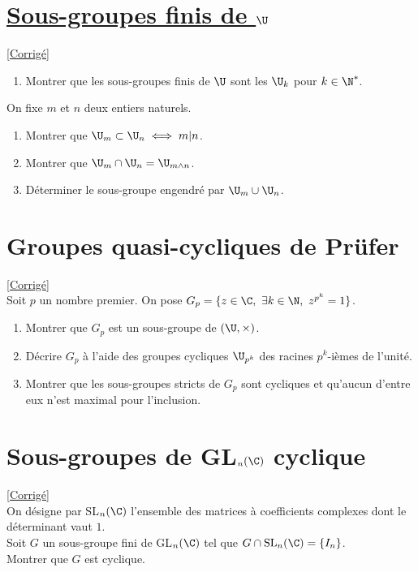 \documentclass[8pt]{book}
\begin{document}
	\section{\underline{Sous-groupes finis de $\U$} }
	\label{Sous-groupes finis de U}
	\textcolor{blue}{\hyperref[Sous-groupes finis de U corrigé]{[Corrigé]}}\\
	\begin{enumerate}[leftmargin=*]
		\item Montrer que les sous-groupes finis de $\U$ sont les $\U_k$ pour $k\in \N^*$.
	\end{enumerate}
	On fixe $m$ et $n$ deux entiers naturels.
	\begin{enumerate}[resume,leftmargin=*]
		\item Montrer que $\U_m\subset \U_n\iff m|n$.
		\item Montrer que $\U_m\cap\U_n=\U_{m\wedge n}$.
		\item Déterminer le sous-groupe engendré par $\U_m\cup\U_n$.
	\end{enumerate}
	
	\section{Groupes quasi-cycliques de Prüfer }
	\label{Groupes quasi-cycliques de Prüfer}
	\textcolor{blue}{\hyperref[Groupes quasi-cycliques de Prüfer corrigé]{[Corrigé]}}\\
	Soit $p$ un nombre premier. On pose $G_p=\{z\in \C,\ \exists k\in \N,\ z^{p^k}=1\}$.
	\begin{enumerate}
		\item Montrer que $G_p$ est un sous-groupe de $(\U,\times)$.
		\item Décrire $G_p$ à l'aide des groupes cycliques $\U_{p^k}$ des racines $p^k$-ièmes de l'unité.
		\item Montrer que les sous-groupes stricts de $G_p$ sont cycliques et qu'aucun d'entre eux n'est maximal pour l'inclusion.
	\end{enumerate}
	
	\section{Sous-groupes de GL$_n(\C)$ cyclique }
	\label{Sous-groupes de GLn(C) qui intersectent trivialement le groupe spécial linéaire}
	\textcolor{blue}{\hyperref[Sous-groupes de GLn(C) qui intersectent trivialement le groupe spécial linéaire corrigé]{[Corrigé]}}\\
	On désigne par SL$_n(\C)$ l'ensemble des matrices à coefficients complexes dont le déterminant vaut $1$.\\
	Soit $G$ un sous-groupe fini de GL$_n(\C)$ tel que $G\cap \text{SL}_n(\C)=\{I_n\}$.\\
	Montrer que $G$ est cyclique.
	
\end{document}
